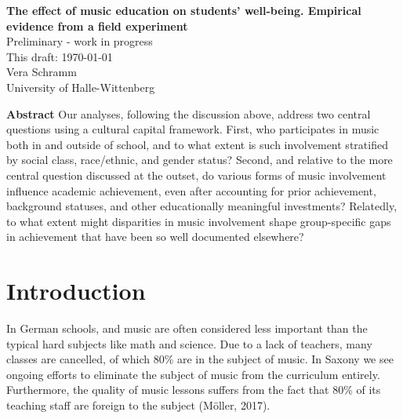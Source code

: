 \documentclass[a4, 12pt]{article}
\begin{document}
\begin{titlepage}
\thispagestyle{empty}%
\begin{center}
\renewcommand{\baselinestretch}{1.0}\normalsize %
\textbf{
The effect of music education on students' well-being. Empirical evidence from a field experiment}\\[1cm]
Preliminary - work in progress \\[1cm]
This draft: \today \\[1cm]
Vera Schramm \\
University of Halle-Wittenberg \\[0.75cm]
 \end{center}


\end{titlepage}

\renewcommand{\baselinestretch}{1}\normalsize

\textbf{\normalsize Abstract}
Our analyses, following the discussion above, address two central questions
using a cultural capital framework. First, who participates in music
both in and outside of school, and to what extent is such involvement
stratified by social class, race/ethnic, and gender status? Second, and relative
to the more central question discussed at the outset, do various forms of
music involvement influence academic achievement, even after accounting
for prior achievement, background statuses, and other educationally meaningful
investments? Relatedly, to what extent might disparities in music
involvement shape group-specific gaps in achievement that have been so well
documented elsewhere?

\clearpage
\tableofcontents

\clearpage
\doublespacing
\pagestyle{plain}

\hypertarget{introduction}{%
\section{Introduction}\label{introduction}}

\label{introduction}

In German schools, and music are often considered less important than the typical hard subjects like math and science. Due to a lack of teachers, many classes are cancelled, of which 80\% are in the subject of music. In Saxony we see ongoing efforts to eliminate the subject of music from the curriculum entirely. Furthermore, the quality of music lessons suffers from the fact that 80\% of its teaching staff are foreign to the subject (Möller, 2017).
\end{document}

